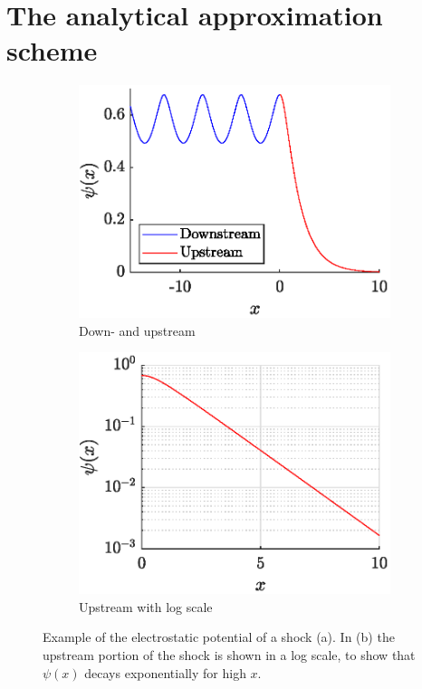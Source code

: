 \documentclass[11pt,a4paper, 
swedish, english %
]{article}
\begin{document}
\section{The analytical approximation scheme}
\label{sec:approx}
\begin{figure}
\centering
\begin{subfigure}[b]{0.4\textwidth}%
\centering
\includegraphics[width=\textwidth]{Sh_M1-300_tau200.eps}
\caption{Down- and upstream}\label{fig:Sh-ex-a}
\end{subfigure}%
\quad
\begin{subfigure}[b]{0.4\textwidth}%
\centering
\includegraphics[width=\textwidth]{Sh-US_M1-300_tau200.eps}
\caption{Upstream with log scale}\label{fig:Sh-ex-b}
\end{subfigure}
\caption{Example of the electrostatic potential of a shock (a). In (b)
  the upstream portion of the shock is shown in a log scale, to show
  that $\psi(x)$ decays exponentially for high $x$.
}\label{fig:Sh-ex}
\end{figure}
\end{document}
